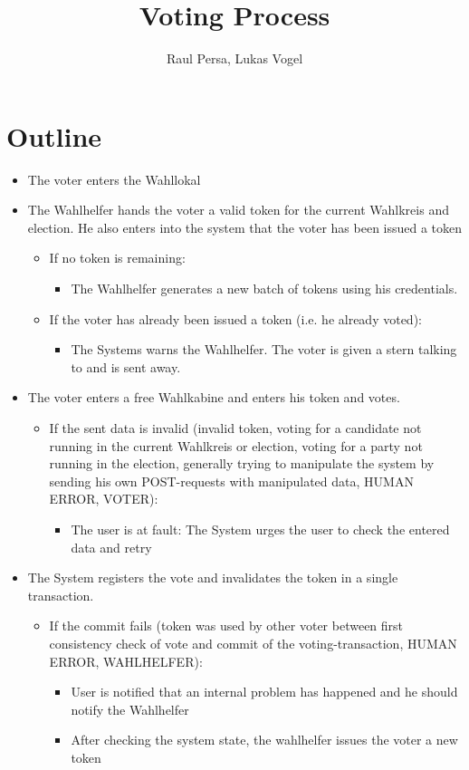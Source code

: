 \documentclass[10pt,a4paper]{article}
\author{Raul Persa, Lukas Vogel}
\title{Voting Process}
\begin{document}
\maketitle

\section*{Outline}
\begin{itemize}
	\item The voter enters the Wahllokal
	\item The Wahlhelfer hands the voter a valid token for the current Wahlkreis and election. 
		He also enters into the system that the voter has been issued a token
		\begin{itemize}
			\item If no token is remaining: 
			\begin{itemize}
				\item The Wahlhelfer generates a new batch of tokens using his credentials.
			\end{itemize}
			\item If the voter has already been issued a token (i.e. he already voted):
			\begin{itemize}
				\item The Systems warns the Wahlhelfer. The voter is given a stern talking to and is sent away.
			\end{itemize}
		\end{itemize}
		

	\item The voter enters a free Wahlkabine and enters his token and votes.
		\begin{itemize}
			\item If the sent data is invalid (invalid token, 
			voting for a candidate not running in the current Wahlkreis or election, 
			voting for a party not running in the election, 
			generally trying to manipulate the system 
			by sending his own POST-requests with manipulated data, HUMAN ERROR, VOTER):
				\begin{itemize}
					\item The user is at fault: 
					The System urges the user to check the entered data and retry
				\end{itemize}
		\end{itemize}

	\item The System registers the vote and invalidates the token in a single transaction.
		\begin{itemize}
			\item If the commit fails 
			(token was used by other voter between first consistency check of vote and commit 
			of the voting-transaction, HUMAN ERROR, WAHLHELFER):
				\begin{itemize}
					\item User is notified that an internal problem has happened and
					 he should notify the Wahlhelfer
					\item After checking the system state, 
					the wahlhelfer issues the voter a new token
			\end{itemize}
	\end{itemize}
\end{itemize}
\end{document}

